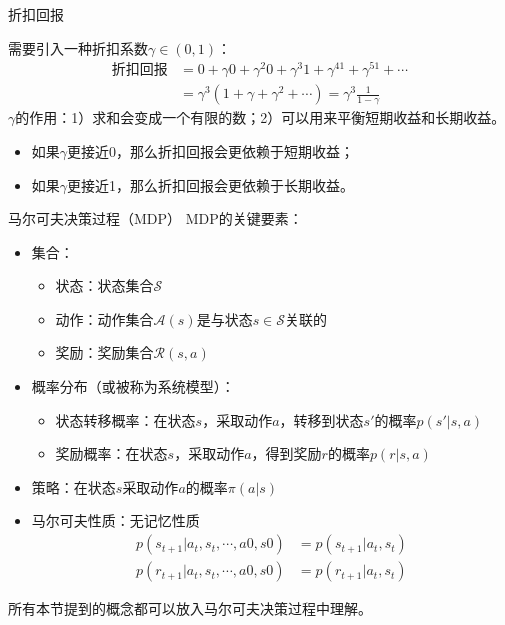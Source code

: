 \begin{frame}{折扣回报}
\begin{center}
    \end{center}
    需要引入一种折扣系数$\gamma\in(0,1)$：
    \[
        \begin{aligned}
            \text{折扣回报}&=0+\gamma 0 +\gamma^2 0+\gamma^3 1 +\gamma^41+\gamma^51+\cdots\\
            &=\gamma^3(1+\gamma+\gamma^2+\cdots)=\gamma^3\frac{1}{1-\gamma}
        \end{aligned}
    \]
    $\gamma$的作用：1）求和会变成一个有限的数；2）可以用来平衡短期收益和长期收益。
    \begin{itemize}
        \item 如果$\gamma$更接近0，那么折扣回报会更依赖于短期收益；
        \item 如果$\gamma$更接近1，那么折扣回报会更依赖于长期收益。
    \end{itemize}
\end{frame}

\begin{frame}{马尔可夫决策过程（MDP）}
    MDP的关键要素：
    \begin{itemize}
        \item 集合：
        \begin{itemize}
            \item 状态：状态集合$\mathcal{S}$
            \item 动作：动作集合$\mathcal{A}(s)$是与状态$s\in \mathcal{S}$关联的
            \item 奖励：奖励集合$\mathcal{R}(s,a)$
        \end{itemize}
        \item 概率分布（或被称为系统模型）：
        \begin{itemize}
            \item 状态转移概率：在状态$s$，采取动作$a$，转移到状态$s'$的概率$p(s'|s,a)$
            \item 奖励概率：在状态$s$，采取动作$a$，得到奖励$r$的概率$p(r|s,a)$
        \end{itemize}
        \item 策略：在状态$s$采取动作$a$的概率$\pi(a|s)$
        \item 马尔可夫性质：无记忆性质
        \[
            \begin{aligned}
                p(s_{t+1}|a_t, s_t, \cdots, a0, s0)&=p(s_{t+1}|a_t,s_t) \\
                p(r_{t+1}|a_t, s_t, \cdots, a0, s0)&=p(r_{t+1}|a_t,s_t)
            \end{aligned}
        \]
    \end{itemize}
    所有本节提到的概念都可以放入马尔可夫决策过程中理解。 
\end{frame}

